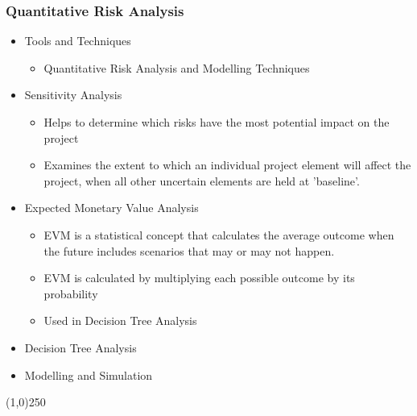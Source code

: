 





\begin{frame}
\frametitle{Quantitative Risk Analysis}
\begin{itemize}
	\item Tools and Techniques
	\begin{itemize}
		\item Quantitative Risk Analysis and Modelling Techniques
	\end{itemize}
	\item Sensitivity Analysis
	\begin{itemize}
		\item Helps to determine which risks have the most potential impact on the project
		\item Examines the extent to which an individual project element will affect the project, when all other uncertain elements are held at 'baseline'.
	\end{itemize}
	\item Expected Monetary Value Analysis
	\begin{itemize}
		\item EVM is a statistical concept that calculates the average outcome when the future includes scenarios that may or may not happen.
		\item EVM is calculated by multiplying each possible outcome by its probability
		\item Used in Decision Tree Analysis
	\end{itemize}
	\item Decision Tree Analysis
	\item Modelling and Simulation
\end{itemize}
\end{frame}\begin{center}\line(1,0){250}\end{center}






